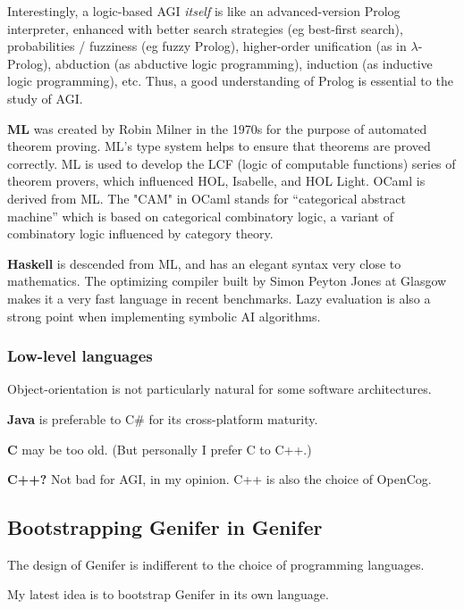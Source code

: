 Interestingly, a logic-based AGI \textit{itself} is like an advanced-version Prolog interpreter, enhanced with better search strategies (eg best-first search), probabilities / fuzziness (eg fuzzy Prolog), higher-order unification (as in $\lambda$-Prolog), abduction (as abductive logic programming), induction (as inductive logic programming), etc.  Thus, a good understanding of Prolog is essential to the study of AGI.

\textbf{ML} was created by Robin Milner in the 1970s for the purpose of automated theorem proving.  ML's type system helps to ensure that theorems are proved correctly.  ML is used to develop the LCF (logic of computable functions) series of theorem provers, which influenced HOL, Isabelle, and HOL Light.  OCaml is derived from ML.  The "CAM" in OCaml stands for ``categorical abstract machine'' which is based on categorical combinatory logic, a variant of combinatory logic influenced by category theory.

\textbf{Haskell} is descended from ML, and has an elegant syntax very close to mathematics.  The optimizing compiler built by Simon Peyton Jones at Glasgow makes it a very fast language in recent benchmarks.  Lazy evaluation is also a strong point when implementing symbolic AI algorithms.

\subsubsection{Low-level languages}

Object-orientation is not particularly natural for some software architectures.

\textbf{Java} is preferable to C\# for its cross-platform maturity.

\textbf{C} may be too old.  (But personally I prefer C to C++.)

\textbf{C++?}  Not bad for AGI, in my opinion.  C++ is also the choice of OpenCog.

\subsection{Bootstrapping Genifer in Genifer}
\label{sec:bootstrapping}

The design of Genifer is indifferent to the choice of programming languages.

My latest idea is to bootstrap Genifer in its own language.  

